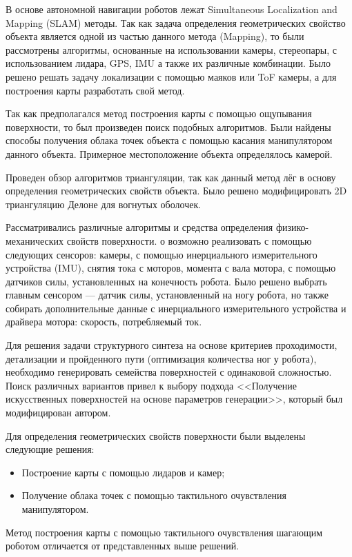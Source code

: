 В основе автономной навигации роботов лежат Simultaneous Localization and Mapping (SLAM) методы. Так как задача определения геометрических свойство объекта является одной из частью данного метода (Mapping), то были рассмотрены алгоритмы, основанные на использовании камеры, стереопары, с использованием лидара, GPS, IMU а также их различные комбинации. Было решено решать задачу локализации с помощью маяков или ToF камеры, а для построения карты разработать свой метод.

Так как предполагался метод построения карты с помощью ощупывания поверхности, то был произведен поиск подобных алгоритмов. Были найдены способы получения облака точек объекта с помощью касания манипулятором данного объекта. Примерное местоположение объекта определялось камерой.

Проведен обзор алгоритмов триангуляции, так как данный метод лёг в основу определения геометрических свойств объекта. Было решено модифицировать 2D триангуляцию Делоне для вогнутых оболочек.

Рассматривались различные алгоритмы и средства определения физико-механических свойств поверхности. о возможно реализовать с помощью следующих сенсоров: камеры, с помощью инерциального измерительного устройства (IMU),  снятия тока с моторов, момента с вала мотора, с помощью датчиков силы, установленных на конечность робота. Было решено выбрать главным сенсором --- датчик силы, установленный на ногу робота, но также собирать дополнительные данные с инерциального измерительного устройства и драйвера мотора: скорость, потребляемый ток.

Для решения задачи структурного синтеза на основе критериев проходимости, детализации и пройденного пути (оптимизация количества ног у робота), необходимо генерировать семейства поверхностей с одинаковой сложностью. Поиск различных вариантов привел к выбору подхода <<Получение искусственных поверхностей на основе параметров генерации>>, который был модифицирован автором.

Для определения геометрических свойств поверхности были  выделены следующие решения:
\begin{itemize}
    \item Построение карты с помощью лидаров и камер;
    \item Получение облака точек с помощью тактильного очувствления манипулятором.
\end{itemize}
Метод построения карты с помощью тактильного очувствления шагающим роботом отличается от представленных выше решений.

